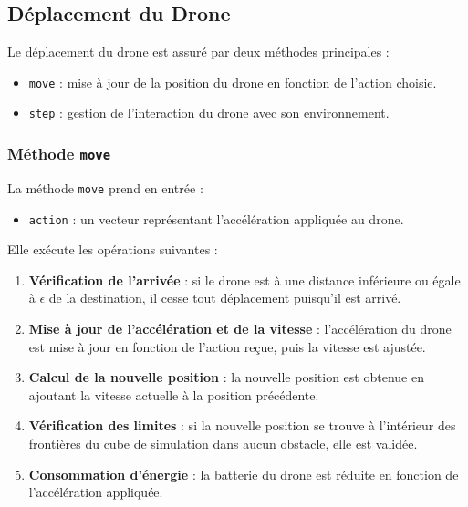 \documentclass[a4paper, 12pt]{article}
\begin{document}
\subsection{Déplacement du Drone}

Le déplacement du drone est assuré par deux méthodes principales :
\begin{itemize}
    \item \texttt{move} : mise à jour de la position du drone en fonction de l’action choisie.
    \item \texttt{step} : gestion de l’interaction du drone avec son environnement.
\end{itemize}

\subsubsection{Méthode \texttt{move}}

La méthode \texttt{move} prend en entrée :
\begin{itemize}
    \item \texttt{action} : un vecteur représentant l’accélération appliquée au drone.
\end{itemize}

Elle exécute les opérations suivantes :
\begin{enumerate}
    \item \textbf{Vérification de l’arrivée} : si le drone est à une distance inférieure ou égale à $\epsilon$ de la destination, il cesse tout déplacement puisqu'il est arrivé.
    \item \textbf{Mise à jour de l’accélération et de la vitesse} : l’accélération du drone est mise à jour en fonction de l’action reçue, puis la vitesse est ajustée.
    \item \textbf{Calcul de la nouvelle position} : la nouvelle position est obtenue en ajoutant la vitesse actuelle à la position précédente.
    \item \textbf{Vérification des limites} : si la nouvelle position se trouve à l’intérieur des frontières du cube de simulation dans aucun obstacle, elle est validée.
    \item \textbf{Consommation d’énergie} : la batterie du drone est réduite en fonction de l’accélération appliquée.
\end{enumerate}
\end{document}

